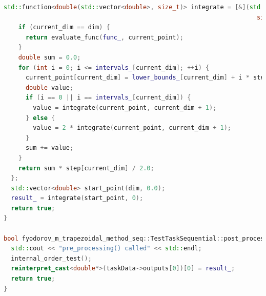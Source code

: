 \documentclass{article}
\begin{document}
\begin{lstlisting}[language=C++]
  std::function<double(std::vector<double>, size_t)> integrate = [&](std::vector<double> current_point,
                                                                     size_t current_dim) -> double {
    if (current_dim == dim) {
      return evaluate_func(func_, current_point);
    }
    double sum = 0.0;
    for (int i = 0; i <= intervals_[current_dim]; ++i) {
      current_point[current_dim] = lower_bounds_[current_dim] + i * step[current_dim];
      double value;
      if (i == 0 || i == intervals_[current_dim]) {
        value = integrate(current_point, current_dim + 1);
      } else {
        value = 2 * integrate(current_point, current_dim + 1);
      }
      sum += value;
    }
    return sum * step[current_dim] / 2.0;
  };
  std::vector<double> start_point(dim, 0.0);
  result_ = integrate(start_point, 0);
  return true;
}

bool fyodorov_m_trapezoidal_method_seq::TestTaskSequential::post_processing() {
  std::cout << "pre_processing() called" << std::endl;
  internal_order_test();
  reinterpret_cast<double*>(taskData->outputs[0])[0] = result_;
  return true;
}
\end{lstlisting}
\end{document}
